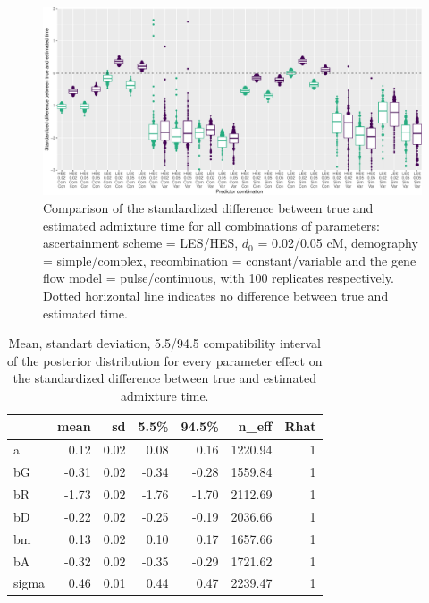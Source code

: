 \documentclass[]{article}
\begin{document}
\begin{figure}
\centering
\includegraphics{Admixture_Time_Inference_Paper_Draft_files/figure-latex/figS2-1.pdf}
\caption{\label{fig:figS2} Comparison of the standardized difference between true and estimated admixture time for all combinations of parameters: ascertainment scheme = LES/HES,  $d_{0}$ = 0.02/0.05 cM, demography = simple/complex, recombination = constant/variable and the gene flow model = pulse/continuous, with 100 replicates respectively. Dotted horizontal line indicates no difference between true and estimated time.}
\end{figure}

\begin{table}[H]

\caption{\label{tab:tableS1}\label{tab:tableS1} Mean, standart deviation, 5.5/94.5 compatibility interval of the posterior distribution for every parameter effect on the standardized difference between true and estimated admixture time.}
\centering
\begin{tabular}{l|r|r|r|r|r|r}
\hline
  & mean & sd & 5.5\% & 94.5\% & n\_eff & Rhat\\
\hline
a & 0.12 & 0.02 & 0.08 & 0.16 & 1220.94 & 1\\
\cline{1-7}
bG & -0.31 & 0.02 & -0.34 & -0.28 & 1559.84 & 1\\
\cline{1-7}
bR & -1.73 & 0.02 & -1.76 & -1.70 & 2112.69 & 1\\
\cline{1-7}
bD & -0.22 & 0.02 & -0.25 & -0.19 & 2036.66 & 1\\
\cline{1-7}
bm & 0.13 & 0.02 & 0.10 & 0.17 & 1657.66 & 1\\
\cline{1-7}
bA & -0.32 & 0.02 & -0.35 & -0.29 & 1721.62 & 1\\
\cline{1-7}
sigma & 0.46 & 0.01 & 0.44 & 0.47 & 2239.47 & 1\\
\hline
\end{tabular}
\end{table}
\end{document}
